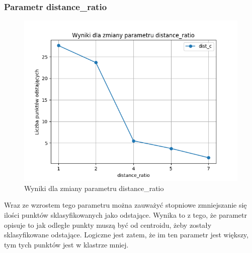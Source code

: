 \documentclass[eng,printmode]{mgr}
\begin{document}
\subsubsection{Parametr distance\_ratio}
\begin{figure}[H]
  \begin{center}
  \includegraphics[scale=0.7]{avg_distance_ratio}
  \end{center}
  \caption{Wyniki dla zmiany parametru distance\_ratio}
  \label{fig:avg_distance_ratio}
\end{figure}
Wraz ze wzrostem tego parametru można zauważyć stopniowe zmniejszanie się ilości punktów sklasyfikowanych jako odstające. Wynika to z tego, że parametr opisuje to jak odległe punkty muszą być od centroidu, żeby zostały sklasyfikowane odstające. Logiczne jest zatem, że im ten parametr jest większy, tym tych punktów jest w klastrze mniej.
\end{document}
